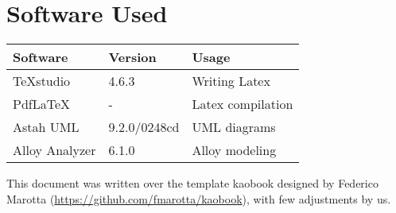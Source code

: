 \chapter{Software Used}
	\begin{center}
		\begin{tabular}{ | m{3cm} | m{3cm} | m{3cm} | } 
				\hline
				\textbf {Software} & \textbf{Version} & \textbf{Usage} \\
				\hline
				TeXstudio & 4.6.3 & Writing Latex \\
				\hline
				PdfLaTeX & - & Latex compilation \\
				\hline
				Astah UML & 9.2.0/0248cd & UML diagrams \\
				\hline
				Alloy Analyzer & 6.1.0 & Alloy modeling \\
				\hline
			\end{tabular}
		\end{center}
	
		This document was written over the template kaobook designed by Federico Marotta (\url{https://github.com/fmarotta/kaobook}), with few adjustments by us.